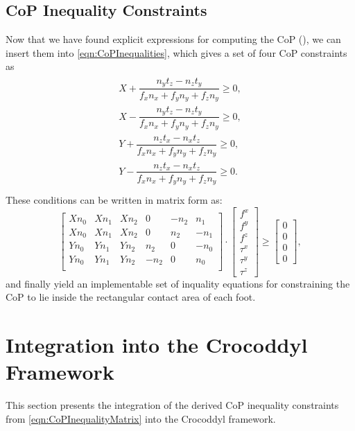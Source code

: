 \subsection{CoP Inequality Constraints}
Now that we have found explicit expressions for computing the \gls{CoP} (), we can insert them into \cref{eqn:CoPInequalities}, which gives a set of four \gls{CoP} constraints as 
\begin{align}\label{eqn:CoPInequalityEqs}
\begin{split}
X + \dfrac{n_yt_z - n_zt_y}{f_xn_x+f_yn_y+f_zn_y} \geq 0, \\
X - \dfrac{n_yt_z - n_zt_y}{f_xn_x+f_yn_y+f_zn_y} \geq 0, \\
Y + \dfrac{n_zt_x-n_xt_z}{f_xn_x+f_yn_y+f_zn_y} \geq 0, \\
Y - \dfrac{n_zt_x-n_xt_z}{f_xn_x+f_yn_y+f_zn_y} \geq 0. \\
\end{split}
\end{align}
These conditions can be written in matrix form as:  
\begin{equation}\label{eqn:CoPInequalityMatrix}
\begin{bmatrix}  
Xn_0 & Xn_1 & Xn_2 & 0 & -n_2 & n_1 \\
Xn_0 & Xn_1 & Xn_2 & 0 & n_2 & -n_1 \\
Yn_0 & Yn_1 & Yn_2 & n_2 & 0 & -n_0 \\
Yn_0 & Yn_1 & Yn_2 & -n_2 & 0 & n_0 \\ \end{bmatrix} \cdot
\begin{bmatrix} f^x \\ f^y \\ f^z \\ \tau^x \\ \tau^y \\ \tau^z \end{bmatrix} \geq
\begin{bmatrix} 0 \\ 0 \\ 0 \\ 0 \end{bmatrix},
\end{equation}
and finally yield an implementable set of inquality equations for constraining the \gls{CoP} to lie inside the rectangular contact area of each foot. 


\section{Integration into the Crocoddyl Framework}
This section presents the integration of the derived CoP inequality constraints from \cref{eqn:CoPInequalityMatrix} into the Crocoddyl framework. 

